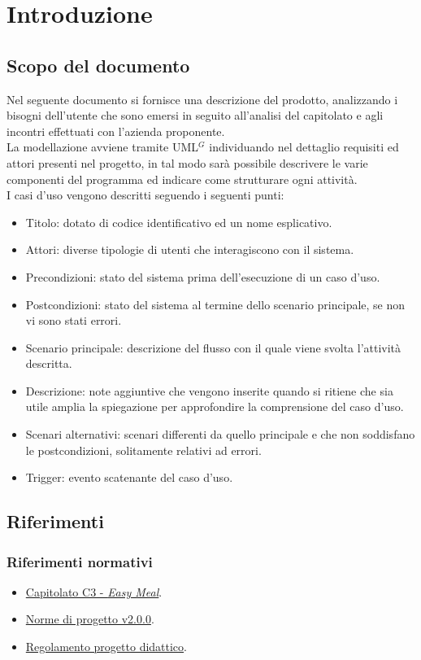 \section{Introduzione}

\subsection{Scopo del documento}
Nel seguente documento si fornisce una descrizione del prodotto, analizzando i bisogni dell'utente che sono emersi in seguito all'analisi del capitolato e agli incontri effettuati con l'azienda proponente. \\
La modellazione avviene tramite UML$^G$ individuando nel dettaglio requisiti ed attori presenti nel progetto, in tal modo sarà possibile descrivere le varie componenti del programma ed indicare come strutturare ogni attività. \\

\noindent
I casi d'uso vengono descritti seguendo i seguenti punti:
\begin{itemize}
	\item Titolo: dotato di codice identificativo ed un nome esplicativo.
	\item Attori: diverse tipologie di utenti che interagiscono con il sistema.
	\item Precondizioni: stato del sistema prima dell'esecuzione di un caso d'uso.
	\item Postcondizioni: stato del sistema al termine dello scenario principale, se non vi sono stati errori.
	\item Scenario principale: descrizione del flusso con il quale viene svolta l'attività descritta.
	\item Descrizione: note aggiuntive che vengono inserite quando si ritiene che sia utile amplia la spiegazione per approfondire la comprensione del caso d'uso.
	\item Scenari alternativi: scenari differenti da quello principale e che non soddisfano le postcondizioni, solitamente relativi ad errori.
	\item Trigger: evento scatenante del caso d'uso.
\end{itemize}

\subsection{Riferimenti}
\subsubsection{Riferimenti normativi}
\begin{itemize}
    \item \href{https://www.math.unipd.it/~tullio/IS-1/2023/Progetto/C3.pdf}{Capitolato C3 - \textit{Easy Meal}}.
    \item \href{https://project-swenergy.github.io/}{Norme di progetto v2.0.0}.
    \item \href{https://www.math.unipd.it/~tullio/IS-1/2023/Dispense/PD2.pdf}{Regolamento progetto didattico}.
\end{itemize}

